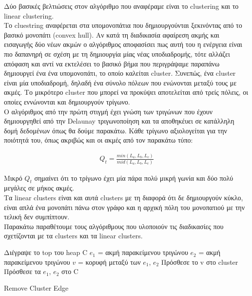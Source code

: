 \documentclass[oneside,12pt]{book}
\theoremstyle{definition}
\begin{document}
Δύο βασικές βελτιώσεις στον αλγόριθμο που αναφέραμε είναι το clustering και το linear clustering. \\

Το cluestring αναφέρεται στα υπομονοπάτια που δημιουργούνται ξεκινόντας από το βασικό μονοπάτι (convex hull). Αν κατά τη διαδικασία αφαίρεση ακμής και εισαγωγής δύο νέων ακμών ο αλγόριθμος αποφασίσει πως αυτή του η ενέργεια είναι πιο δαπανηρή σε σχέση με τη δημιουργία μίας νέας υποδιαδρομής, τότε αλλάζει απόφαση και αντί να εκτελέσει το βασικό βήμα που περιγράψαμε παραπάνω δημιουργεί ένα ένα υπομονοπάτι, το οποίο καλείται cluster. Συνεπώς, ένα cluster είναι μία υποδιαδρομή, δηλαδή ένα σύνολο πόλεων που ενώνονται μεταξύ τους με ακμές. Το μικρότερο cluster που μπορεί να προκύψει αποτελείται από τρείς πόλεις, οι οποίες εννώνονται και δημιουργούν τρίγωνο. \\

Ο αλγόριθμος από την πρώτη στιγμή έχει γνώση των τριγώνων που έχουν δημιουργηθεί από την Delaunay τριγωνοποίηση και τα αποθηκέυει σε κατάλληλη δομή δεδομένων όπως θα δούμε παρακάτω. Κάθε τρίγωνο αξιολογείται για την ποιότητά του, όπως ακριβώς και οι ακμές από τον παρακάτω τύπο:

\begin{align*}
	Q_{t} = \frac{min(L_a, L_b, L_c)}{mid(L_a, L_b, L_c)}
\end{align*}

Μικρό \(Q_t\) σημαίνει ότι το τρίγωνο έχει μία πάρα πολύ μικρή γωνία και δύο πολύ μεγάλες σε μήκος ακμές. \\

Τα linear clusters είναι και αυτά clusters με τη διαφορά ότι δε δημιουργούν κύκλο, είναι απλά ένα μονοπάτι πάνω στον γράφο και η αρχική πόλη του μονοπατιού με την τελική δεν συμπίπτουν. \\

Παρακάτω παραθέτουμε τους αλγόριθμους που υλοποιούν τις διαδικασίες που σχετίζονται με τα clusters και τα linear clusters. \\

\begin{algorithm}[H]
	\SetAlgoLined

	Διέγραψε το top του heap C \;
	\(e_1\) = ακμή παρακείμενου τριγώνου \;
	\(e_2\) = ακμή παρακείμενου τριγώνου \;
	\(v\) = κορυφή μεταξύ των \(e_1\), \(e_2\) \;
	Πρόσθεσε το v στο cluster \;
	Πρόσθεσε τα \(e_1\), \(e_2\) στο C \;

	\caption{Remove Cluster Edge}
\end{algorithm}
\end{document}
